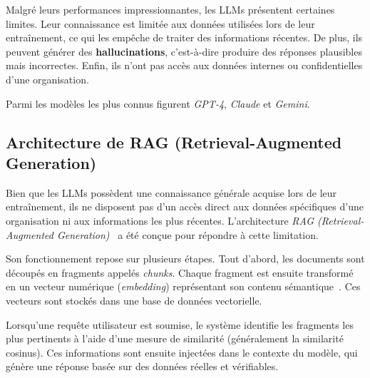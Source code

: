 Malgré leurs performances impressionnantes, les LLMs présentent certaines limites. Leur connaissance est limitée aux données utilisées lors de leur entraînement, ce qui les empêche de traiter des informations récentes. De plus, ils peuvent générer des \textbf{hallucinations}, c’est-à-dire produire des réponses plausibles mais incorrectes. Enfin, ils n’ont pas accès aux données internes ou confidentielles d’une organisation.

Parmi les modèles les plus connus figurent \textit{GPT-4}, \textit{Claude} et \textit{Gemini}.


\subsection{Architecture de RAG (Retrieval-Augmented Generation)}

Bien que les LLMs possèdent une connaissance générale acquise lors de leur entraînement, ils ne disposent pas d’un accès direct aux données spécifiques d’une organisation ni aux informations les plus récentes. L’architecture \textit{RAG (Retrieval-Augmented Generation)}~\cite{lewis2020rag} a été conçue pour répondre à cette limitation.

Son fonctionnement repose sur plusieurs étapes. Tout d’abord, les documents sont découpés en fragments appelés \textit{chunks}. Chaque fragment est ensuite transformé en un vecteur numérique (\textit{embedding}) représentant son contenu sémantique~\cite{reimers2019sbert}. Ces vecteurs sont stockés dans une base de données vectorielle.

Lorsqu’une requête utilisateur est soumise, le système identifie les fragments les plus pertinents à l’aide d’une mesure de similarité (généralement la similarité cosinus). Ces informations sont ensuite injectées dans le contexte du modèle, qui génère une réponse basée sur des données réelles et vérifiables.

